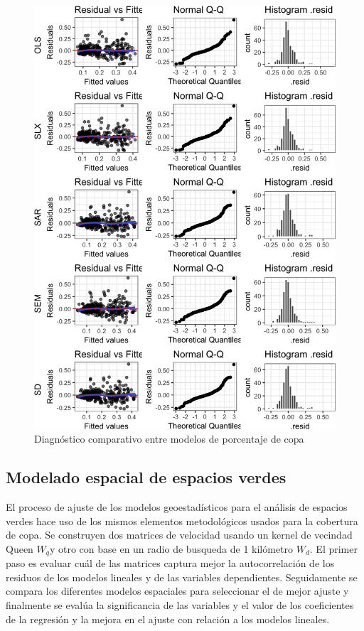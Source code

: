 \documentclass[12pt,]{book}
\begin{document}
\begin{figure}
\includegraphics[width=1\linewidth]{tesis-unigis_files/figure-latex/diag-model-espaciales-copaap-1} \caption{Diagnóstico comparativo entre modelos de porcentaje de copa}\label{fig:diag-model-espaciales-copaap}
\end{figure}

\subsection{Modelado espacial de espacios
verdes}\label{modelado-espacial-de-espacios-verdes}

El proceso de ajuste de los modelos geoestadísticos para el análisis de
espacios verdes hace uso de los mismos elementos metodológicos usados
para la cobertura de copa. Se construyen dos matrices de velocidad
usando un kernel de vecindad Queen \(W_q\)y otro con base en un radio de
busqueda de 1 kilómetro \(W_d\). El primer paso es evaluar cuál de las
matrices captura mejor la autocorrelación de los residuos de los modelos
lineales y de las variables dependientes. Seguidamente se compara los
diferentes modelos espaciales para seleccionar el de mejor ajuste y
finalmente se evalúa la significancia de las variables y el valor de los
coeficientes de la regresión y la mejora en el ajuste con relación a los
modelos lineales.
\end{document}
